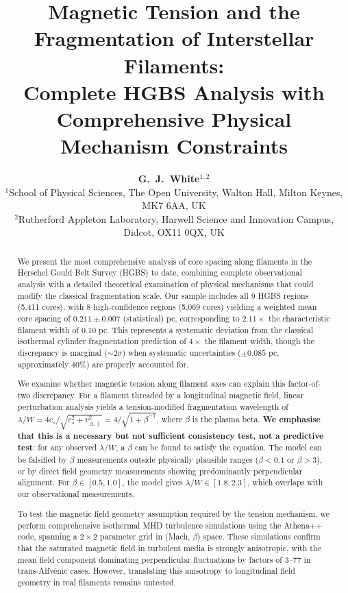 \documentclass[11pt,a4paper]{article}
\title{\textbf{Magnetic Tension and the Fragmentation of Interstellar Filaments:\\
Complete HGBS Analysis with Comprehensive Physical Mechanism Constraints}}
\author{\textbf{G.~J.~White$^{1,2}$}\\
\small{$^{1}$School of Physical Sciences, The Open University, Walton Hall, Milton Keynes, MK7 6AA, UK}\\
\small{$^{2}$Rutherford Appleton Laboratory, Harwell Science and Innovation Campus, Didcot, OX11 0QX, UK}}
\begin{document}
\maketitle

\begin{abstract}
We present the most comprehensive analysis of core spacing along filaments in the Herschel Gould Belt Survey (HGBS) to date, combining complete observational analysis with a detailed theoretical examination of physical mechanisms that could modify the classical fragmentation scale. Our sample includes all 9 HGBS regions (5,411 cores), with 8 high-confidence regions (5,069 cores) yielding a weighted mean core spacing of $0.211 \pm 0.007$ (statistical) pc, corresponding to $2.11\times$ the characteristic filament width of $0.10$ pc. This represents a systematic deviation from the classical isothermal cylinder fragmentation prediction of $4\times$ the filament width, though the discrepancy is marginal ($\sim2\sigma$) when systematic uncertainties ($\pm0.085$ pc, approximately 40\%) are properly accounted for.

We examine whether magnetic tension along filament axes can explain this factor-of-two discrepancy. For a filament threaded by a longitudinal magnetic field, linear perturbation analysis yields a tension-modified fragmentation wavelength of $\lambda/W = 4c_s/\sqrt{c_s^2 + v_{A,\parallel}^2} = 4/\sqrt{1 + \beta^{-1}}$, where $\beta$ is the plasma beta. \textbf{We emphasise that this is a necessary but not sufficient consistency test, not a predictive test}: for any observed $\lambda/W$, a $\beta$ can be found to satisfy the equation. The model can be falsified by $\beta$ measurements outside physically plausible ranges ($\beta < 0.1$ or $\beta > 3$), or by direct field geometry measurements showing predominantly perpendicular alignment. For $\beta \in [0.5, 1.0]$, the model gives $\lambda/W \in [1.8, 2.3]$, which overlaps with our observational measurements.

To test the magnetic field geometry assumption required by the tension mechanism, we perform comprehensive isothermal MHD turbulence simulations using the Athena++ code, spanning a $2\times2$ parameter grid in (Mach, $\beta$) space. These simulations confirm that the saturated magnetic field in turbulent media is strongly anisotropic, with the mean field component dominating perpendicular fluctuations by factors of 3--77 in trans-Alfv\'enic cases. However, translating this anisotropy to longitudinal field geometry in real filaments remains untested.


\end{abstract}
\end{document}
